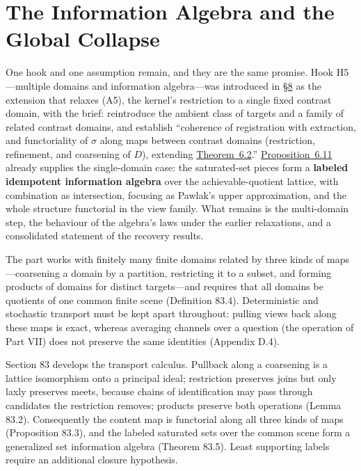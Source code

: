 \part{The Information Algebra and the Global Collapse}


One hook and one assumption remain, and they are the same promise. Hook H5---\hspace{0pt}multiple domains and information algebra---\hspace{0pt}was introduced in \hyperlink{sec:8}{§8} as the extension that relaxes (A5), the kernel's restriction to a single fixed contrast domain, with the brief: reintroduce the ambient class of targets and a family of related contrast domains, and establish ``coherence of registration with extraction, and functoriality of \(\sigma\) along maps between contrast domains (restriction, refinement, and coarsening of \(D\)), extending \hyperlink{stmt:6.2}{Theorem~6.2}.'' \hyperlink{stmt:6.11}{Proposition~6.11} already supplies the single-domain case: the saturated-set pieces form a \textbf{labeled idempotent information algebra} over the achievable-quotient lattice, with combination as intersection, focusing as Pawlak's upper approximation, and the whole structure functorial in the view family. What remains is the multi-domain step, the behaviour of the algebra's laws under the earlier relaxations, and a consolidated statement of the recovery results.

The part works with finitely many finite domains related by three kinds of maps---\hspace{0pt}coarsening a domain by a partition, restricting it to a subset, and forming products of domains for distinct targets---\hspace{0pt}and requires that all domains be quotients of one common finite scene (Definition 83.4). Deterministic and stochastic transport must be kept apart throughout: pulling views back along these maps is exact, whereas averaging channels over a question (the operation of Part VII) does not preserve the same identities (Appendix D.4).

Section 83 develops the transport calculus. Pullback along a coarsening is a lattice isomorphism onto a principal ideal; restriction preserves joins but only laxly preserves meets, because chains of identification may pass through candidates the restriction removes; products preserve both operations (Lemma 83.2). Consequently the content map is functorial along all three kinds of maps (Proposition 83.3), and the labeled saturated sets over the common scene form a generalized set information algebra (Theorem 83.5). Least supporting labels require an additional closure hypothesis.

